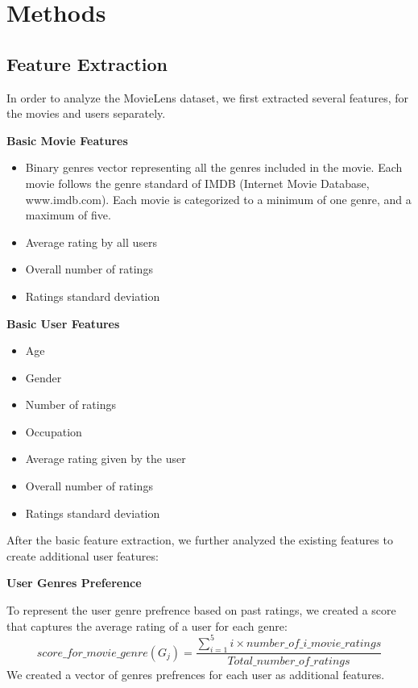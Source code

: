 \section{Methods}
\label{sec:methods}


\subsection{Feature Extraction}
In order to analyze the MovieLens dataset, we first extracted several features, for the movies and users separately. 

\textbf{Basic Movie Features} 
\begin{itemize}
\item Binary genres vector representing all the genres included in the movie. Each movie follows the genre standard of IMDB (Internet Movie Database, www.imdb.com). Each movie is categorized to a minimum of one genre, and a maximum of five.
\item Average rating by all users
\item Overall number of ratings
\item Ratings standard deviation
\end{itemize}

\textbf{Basic User Features} 
\begin{itemize}
\item Age
\item Gender
\item Number of ratings
\item Occupation
\item Average rating given by the user
\item Overall number of ratings
\item Ratings standard deviation
\end{itemize}

After the basic feature extraction, we further analyzed the existing features to create additional user features:

\textbf{User Genres Preference}

To represent the user genre prefrence based on past ratings, we created a score that captures the average rating of a user for each genre: 
\begin{equation} score\_for\_movie\_genre(G_j) = \frac{\sum^5_{i=1}{i\times number\_of\_i\_movie\_ratings}}{Total\_number\_of\_ratings} 
\end{equation}
We created a vector of genres prefrences for each user as additional features.

